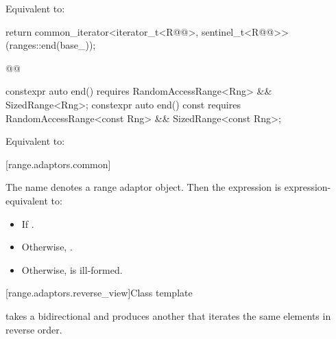 {\begin{itemdescr}
\pnum
\effects Equivalent to:
\begin{codeblock}
return common_iterator<iterator_t<R@@>, sentinel_t<R@@>>(ranges::end(base_));
\end{codeblock}
\begin{codeblock}
@@
\end{codeblock}
\end{itemdescr}

%
\begin{itemdecl}
constexpr auto end()
  requires RandomAccessRange<Rng> && SizedRange<Rng>;
constexpr auto end() const
  requires RandomAccessRange<const Rng> && SizedRange<const Rng>;
\end{itemdecl}

\begin{itemdescr}
\pnum
\effects Equivalent to: 
\end{itemdescr}

[range.adaptors.common]{}

\pnum
The name  denotes a range adaptor
object.  Then the expression
 is expression-equivalent to:

\begin{itemize}
\item If   
.

\item Otherwise, 
.

\item Otherwise,  is ill-formed.
\end{itemize}


[range.adaptors.reverse_view]{Class template }

\pnum
{}  takes a bidirectional 
 and produces another   that
iterates the same elements in reverse order.

}
